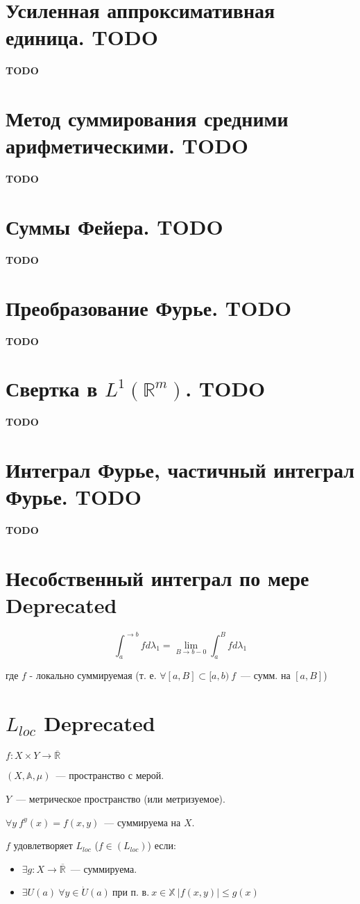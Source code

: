 \documentclass[paper=a4, fontsize=17pt]{article}
\begin{document}
\section{Усиленная аппроксимативная единица. TODO}
	{\color{red} \textbf{TODO}}
\section{Метод суммирования средними арифметическими. TODO}
	{\color{red} \textbf{TODO}}
\section{Суммы Фейера. TODO}
	{\color{red} \textbf{TODO}}
\section{Преобразование Фурье. TODO}
	{\color{red} \textbf{TODO}}
\section{Свертка в $L^1(\mathds{R}^m)$. TODO}
	{\color{red} \textbf{TODO}}
\section{Интеграл Фурье, частичный интеграл Фурье. TODO}
	{\color{red} \textbf{TODO}}


	\section{Несобственный интеграл по мере \Large Deprecated}

	$$ \int_{a}^{\rightarrow b} f d\lambda_1 = \lim\limits_{B \rightarrow b-0} \int_{a}^{B} f d\lambda_1 $$

	где $ f $ - локально суммируемая (т. е. $ \forall [a, B] \subset [a, b) ~ f $~--- сумм. на $ [a, B] $)

	\section{$ L_{loc} $ \Large Deprecated}

	$ f : X \times Y \rightarrow \overline{\mathbb{R}}$

	$ (X, \mathds{A}, \mu) $~--- пространство с мерой.

	$Y$~--- метрическое пространство (или метризуемое).

	$\forall y \ f^y(x) = f(x, y)$~--- суммируема на $X$.

	$f$ удовлетворяет $L_{loc}$ ($ f \in (L_{loc}) $) если:
	\begin{itemize}
		\item $ \exists g : X \rightarrow \overline{\mathbb{R}} $~--- суммируема.
		\item $ \exists U(a) \ \forall y \in \dot{U} (a) \ \text{при п. в.} ~ x \in \mathbb{X} ~ |f(x, y)| \leq g(x)$
	\end{itemize}
\end{document}
